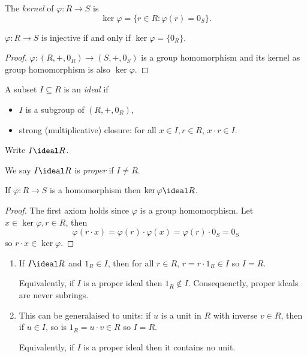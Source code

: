 \documentclass[a4paper]{article}
\theoremstyle{definition}
\begin{document}
The \emph{kernel} of \(\varphi: R \to S\) is
\[
  \ker \varphi = \{r\in R: \varphi(r) = 0_S\}.
\]

\begin{lemma}
  \(\varphi:R \to S\) is injective if and only if \(\ker \varphi = \{0_R\}\).
\end{lemma}

\begin{proof}
  \(\varphi: (R, +, 0_R) \to (S, +, 0_S)\) is a group homomorphism and its kernel as group homomorphism is also \(\ker \varphi\).
\end{proof}

\begin{definition}[Ideal]
  A subset \(I \subseteq R\) is an \emph{ideal} if
  \begin{itemize}
  \item \(I\) is a subgroup of \((R, +, 0_R)\),
  \item strong (multiplicative) closure: for all \(x \in I, r \in R\), \(x \cdot r \in I\).
  \end{itemize}
  Write \(I \ideal R\).
\end{definition}

We say \(I \ideal R\) is \emph{proper} if \(I \neq R\).

\begin{lemma}
  If \(\varphi: R \to S\) is a homomorphism then \(\ker \varphi \ideal R\).
\end{lemma}

\begin{proof}
  The first axiom holds since \(\varphi\) is a group homomorphism. Let \(x \in \ker \varphi, r \in R\), then
  \[
    \varphi(r \cdot x) = \varphi(r) \cdot \varphi(x) = \varphi(r) \cdot 0_S = 0_S
  \]
  so \(r \cdot x \in \ker \varphi\).
\end{proof}

\begin{eg}\leavevmode
  \begin{enumerate}
  \item If \(I \ideal R\) and \(1_R \in I\), then for all \(r \in R\), \(r = r \cdot 1_R \in I\) so \(I = R\).

    Equivalently, if \(I\) is a proper ideal then \(1_R \notin I\). Consequenctly, proper ideals are never subrings.
  \item This can be generalaised to units: if \(u\) is a unit in \(R\) with inverse \(v \in R\), then if \(u \in I\), so is \(1_R = u \cdot v \in R\) so \(I = R\).

    Equivalently, if \(I\) is a proper ideal then it contains no unit.
  \end{enumerate}
\end{eg}
\end{document}
